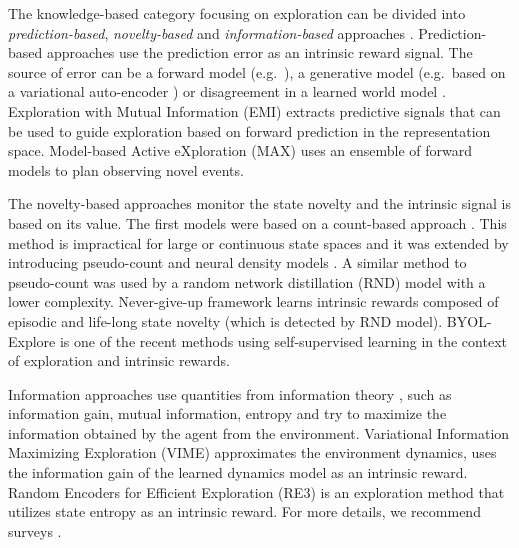 \documentclass[a4paper,11pt]{elsarticle}
\begin{document}
The knowledge-based category focusing on exploration can be divided into \textit{prediction-based}, \textit{novelty-based} and \textit{information-based} approaches \citep{aubret2019survey}.
Prediction-based approaches use the prediction error as an intrinsic reward signal. The source of error can be a forward model (e.g.~\cite{stadie2015incentivizing,bellemare13arcade,Pathak2017}), a generative model \cite{yu2020intrinsic} (e.g.~based on a variational auto-encoder \cite{kingma2013auto}) or disagreement in a learned world model \citep{sekar2020planning}. Exploration with Mutual Information (EMI) \citep{kim2018emi} extracts predictive signals that can be used to guide exploration based on forward prediction in the representation space. Model-based Active eXploration (MAX) \citep{shyam2019model} uses an ensemble of forward models to plan observing novel events.

The novelty-based approaches monitor the state novelty and the intrinsic signal is based on its value. The first models were based on a count-based approach \citep{tang2017exploration}. This method is impractical for large or continuous state spaces and it was extended by introducing pseudo-count and neural density models \citep{ostrovski2017count,martin2017count,machado2018count}. A similar method to pseudo-count was used by a random network distillation (RND) model \citep{burda2018exploration} with a lower complexity. Never-give-up framework \citep{badia2020never} learns intrinsic rewards composed of episodic and life-long state novelty (which is detected by RND model). BYOL-Explore \citep{guo2022byol} is one of the recent methods using self-supervised learning in the context of exploration and intrinsic rewards.

Information approaches use quantities from information theory \citep{shannon1948mathematical}, such as information gain, mutual information, entropy and try to maximize the information obtained by the agent from the environment. Variational Information Maximizing Exploration (VIME) \citep{houthooft2016vime} approximates the environment dynamics, uses the information gain of the learned dynamics model as an intrinsic reward. Random Encoders for Efficient Exploration (RE3) \citep{seo2021state} is an exploration method that utilizes state entropy as an intrinsic reward.
For more details, we recommend surveys \cite{burda2018large, aubret2019survey, yuan2022intrinsically}.
\end{document}
